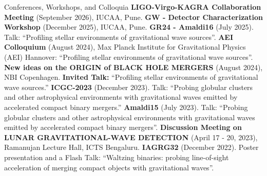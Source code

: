 \begin{rubric}{Conferences, Workshops, and Colloquia}
\entry*[] \textbf{LIGO-Virgo-KAGRA Collaboration Meeting} (September 2026), IUCAA, Pune.
%
\entry*[] \textbf{GW - Detector Characterization Workshop} (December 2025), IUCAA, Pune.
%
\entry*[] \textbf{GR24 - Amaldi16} (July 2025). Talk: ``Profiling stellar environments of gravitational wave sources''.
%
\entry*[] \textbf{AEI Colloquium} (August 2024), Max Planck Institute for Gravitational Physics (AEI) Hannover: ``Profiling stellar environments of gravitational wave sources''.
%
\entry*[] \textbf{New ideas on the ORIGIN of BLACK HOLE MERGERS} (August 2024), NBI Copenhagen. \textbf{Invited Talk:} ``Profiling stellar environments of gravitational wave sources.''
%
\entry*[] \textbf{ICGC-2023} (December 2023). Talk: ``Probing globular clusters and other astrophysical environments with gravitational waves emitted by accelerated compact binary mergers.''
%
\entry*[] \textbf{Amaldi15} (July 2023). Talk: ``Probing globular clusters and other astrophysical environments with gravitational waves emitted by accelerated compact binary mergers''.
%
\entry*[] \textbf{Discussion Meeting on LUNAR GRAVITATIONAL-WAVE DETECTION} (April 17 - 20, 2023), Ramanujan Lecture Hall, ICTS Bengaluru.
%
\entry*[] \textbf{IAGRG32} (December 2022). Poster presentation and a Flash Talk: ``Waltzing binaries: probing line-of-sight acceleration of merging compact objects with gravitational waves''.
%

\end{rubric}
